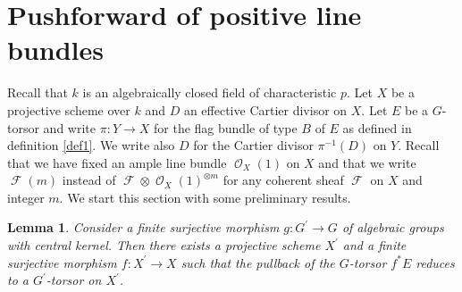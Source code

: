 \documentclass[11pt]{amsart}
\numberwithin{subsection}{section}
\numberwithin{figure}{section}
\numberwithin{table}{section}
\theoremstyle{1}
\newtheorem{lemma}[theorem]{Lemma}
\theoremstyle{2}
\DeclareMathOperator{\Fc}{\mathcal{F}}
\DeclareMathOperator{\Oc}{\mathcal{O}}
\begin{document}
\section{Pushforward of positive line bundles}\label{sect_push}
Recall that $k$ is an algebraically closed field of characteristic $p$. Let $X$ be a projective scheme over $k$ and $D$ an effective Cartier divisor on $X$. Let $E$ be a $G$-torsor and write $\pi : Y \rightarrow X$ for the flag bundle of type $B$ of $E$ as defined in definition \ref{def1}. We write also $D$ for the Cartier divisor $\pi^{-1}(D)$ on $Y$. Recall that we have fixed an ample line bundle $\Oc_X(1)$ on $X$ and that we write $\Fc(m)$ instead of $\Fc \otimes \Oc_X(1)^{\otimes m}$ for any coherent sheaf $\Fc$ on $X$ and integer $m$. We start this section with some preliminary results. 
\begin{lemma}\label{classifying_trick}
Consider a finite surjective morphism $g : G^\prime \rightarrow G$ of algebraic groups with central kernel. Then there exists a projective scheme $X^\prime$ and a finite surjective morphism $f : X^\prime \rightarrow X$ such that the pullback of the $G$-torsor $f^*E$ reduces to a $G^\prime$-torsor on $X^\prime$.
\end{lemma}
\end{document}
